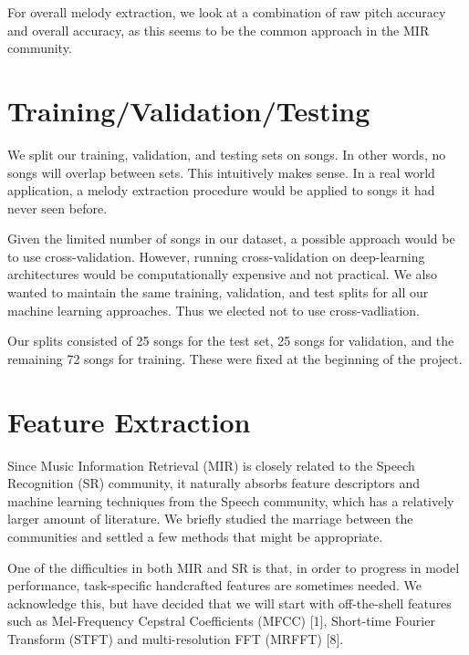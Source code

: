 \documentclass{article} %
\begin{document}
For overall melody extraction, we look at a combination of raw pitch accuracy and overall accuracy, as this seems to be the common approach in the MIR community.

\section{Training/Validation/Testing}

We split our training, validation, and testing sets on songs.  In other words, no songs will overlap between sets.  This intuitively makes sense.  In a real world application, a melody extraction procedure would be applied to songs it had never seen before. 

Given the limited number of songs in our dataset, a possible approach would be to use cross-validation.  However, running cross-validation on deep-learning architectures would be computationally expensive and not practical.  We also wanted to maintain the same training, validation, and test splits for all our machine learning approaches.  Thus we elected not to use cross-vadliation.

Our splits consisted of 25 songs for the test set, 25 songs for validation, and the remaining 72 songs for training.  These were fixed at the beginning of the project.

\section{Feature Extraction}
Since Music Information Retrieval (MIR) is closely related to the Speech Recognition (SR) community, it naturally absorbs feature descriptors and 
machine learning techniques from the Speech community, which has a relatively larger amount of literature.
We briefly studied the marriage between the communities and settled a few methods that might be appropriate. 

One of the difficulties in both MIR and SR is that, in order to progress in model performance, task-specific handcrafted features are sometimes needed.  We acknowledge this, but have decided that we will start with off-the-shell features such as Mel-Frequency Cepstral Coefficients (MFCC) [1], Short-time Fourier Transform (STFT) and multi-resolution FFT (MRFFT) [8].
\end{document}
